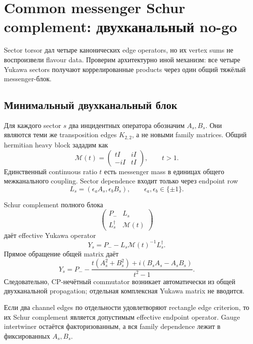 \chapter{Common messenger Schur complement: двухканальный no-go}

Sector torsor дал четыре канонических edge operators, но их vertex sums не
воспроизвели flavour data. Проверим архитектурно иной механизм: все четыре
Yukawa sectors получают коррелированные products через один общий тяжёлый
messenger-блок.

\section{Минимальный двухканальный блок}

Для каждого sector \(s\) два инцидентных оператора обозначим
\(A_s,B_s\). Они являются теми же transposition edges \(K_{2,2}\), а не
новыми family matrices. Общий hermitian heavy block зададим как
\begin{equation}
 \mathcal M(t)=
 \begin{pmatrix}
 tI&iI\\
 -iI&tI
 \end{pmatrix},
 \qquad t>1.
\end{equation}
Единственный continuous ratio \(t\) есть messenger mass в единицах общего
межканального coupling. Sector dependence входит только через endpoint row
\begin{equation}
 L_s=(\epsilon_aA_s,\epsilon_bB_s),
 \qquad \epsilon_a,\epsilon_b\in\{\pm1\}.
\end{equation}

Schur complement полного блока
\begin{equation}
 \begin{pmatrix}
 P_-&L_s\\
 L_s^\dagger&\mathcal M(t)
 \end{pmatrix}
\end{equation}
даёт effective Yukawa operator
\begin{equation}
 Y_s=P_--L_s\mathcal M(t)^{-1}L_s^\dagger.
\end{equation}
Прямое обращение общей matrix даёт
\begin{equation}
 Y_s=P_--\frac{
 t(A_s^2+B_s^2)+i(B_sA_s-A_sB_s)
 }{t^2-1}.
\end{equation}
Следовательно, CP-нечётный commutator возникает автоматически из общей
двухканальной propagation; отдельная комплексная Yukawa matrix не вводится.

\begin{proposition}
Если два channel edges по отдельности удовлетворяют rectangle edge criterion,
то их Schur complement является допустимым effective endpoint operator.
Gauge intertwiner остаётся факторизованным, а вся family dependence лежит в
фиксированных \(A_s,B_s\).
\end{proposition}

